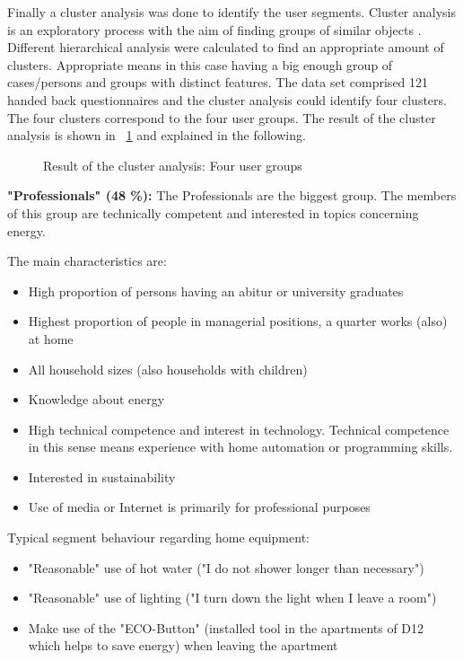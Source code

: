 Finally a cluster analysis was done to identify the user segments. Cluster analysis is an exploratory process with the aim of finding groups of similar objects \cite{tuffery2011data}. Different hierarchical analysis were calculated to find an appropriate amount of clusters. Appropriate means in this case having a big enough group of cases/persons and groups with distinct features. The data set comprised 121 handed back questionnaires and the cluster analysis could identify four clusters. The four clusters correspond to the four user groups. The result of the cluster analysis is shown in ~\ref{fig:cluster} and explained in the following.

\begin{figure}[h]
	\centering
	\caption{Result of the cluster analysis: Four user groups}
	\label{fig:cluster} %
\end{figure}


\textbf{"Professionals" (48 \%):}
The Professionals are the biggest group. The members of this group are technically competent and interested in topics concerning energy.

The main characteristics are:
\begin{itemize}
	\item High proportion of persons having an abitur or university graduates
	\item Highest proportion of people in managerial positions, a quarter works (also) at home
	\item All household sizes (also households with children)
	\item Knowledge about energy
	\item High technical competence and interest in technology. Technical competence in this sense means experience with home automation or programming skills.
	\item Interested in sustainability
	\item Use of media or Internet is primarily for professional purposes
\end{itemize}

Typical segment behaviour regarding home equipment:
 \begin{itemize}
 	\item "Reasonable" use of hot water ("I do not shower longer than necessary")
 	\item "Reasonable" use of lighting ("I turn down the light when I leave a room")
 	\item Make use of the "ECO-Button" (installed tool in the apartments of D12 which helps to save energy) when leaving the apartment
 \end{itemize}

